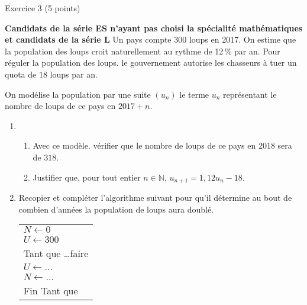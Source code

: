 
  \begin{h2}Exercice 3 (5 points)\end{h2}
            \textbf{Candidats de la série ES n'ayant pas choisi la spécialité \og mathématiques \fg{} et candidats de la série L}
          \bigbreak
          Un pays compte $300$ loups en 2017. On estime que la population des loups croit
          naturellement au rythme de 12\,\% par an. Pour réguler la population des loups. le
          gouvernement autorise les chasseurs à tuer un quota de $18$ loups par an.
          \par
          On modélise la population par une suite $\left(u_n\right)$ le terme $u_n$ représentant le nombre de loups de ce pays en $2017+n$.
          \medbreak
          \begin{enumerate}
               \item
               \begin{enumerate}[label=\alph*.]
                    \item Avec ce modèle. vérifier que le nombre de loups de ce pays en 2018 sera de $318$.
                    \item  Justifier que, pour tout entier $n \in \mathbb{N}$, \:  $u_{n+1} = 1,12u_n - 18$.
               \end{enumerate}
               \item Recopier et compléter l'algorithme suivant pour qu'il détermine au bout de combien
               d'années la population de loups aura doublé.
               \begin{center}
                   \begin{extern}%
                    \begin{tabularx}{0.4\linewidth}{|X|}\hline
                         $N \gets 0$\\
                         $U \gets 300$\\
                         Tant que \ldots faire\\
                         \hspace{1cm}$U \gets \ldots$\\
                         \hspace{1cm}$N \gets \ldots$\\
                         Fin Tant que\\ \hline
                    \end{tabularx}
                   \end{extern}

\end{center}
\end{enumerate}
